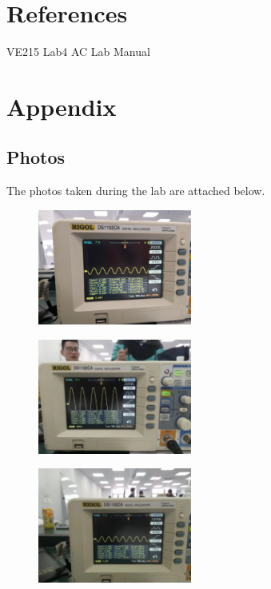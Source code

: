 \documentclass{article}
\begin{document}
\section{References}
\noindent [1] VE215 Lab4 AC Lab Manual

\section{Appendix}
\subsection{Photos}
The photos taken during the lab are attached below.
    
\begin{figure}\centering
    \includegraphics[width=0.45\textwidth]{1}
    
\end{figure}

\begin{figure}\centering
    \includegraphics[width=0.45\textwidth]{2}
\end{figure}

\begin{figure}\centering
    \includegraphics[width=0.45\textwidth]{3}
\end{figure}
\end{document}
